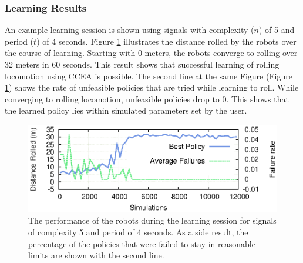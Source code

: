 \subsubsection{Learning Results}
An example learning session is shown using signals with complexity ($n$) of 5 and period ($t$) of 4 seconds.  
Figure \ref{fig:learning} illustrates the distance rolled by the robots over the course of learning. 
Starting with 0 meters, the robots converge to rolling over 32 meters in 60 seconds. 
This result shows that successful learning of rolling locomotion using CCEA is possible. 
The second line at the same Figure (Figure \ref{fig:learning}) shows the rate of unfeasible policies that are tried while learning to roll. 
While converging to rolling locomotion, unfeasible policies drop to 0. 
This shows that the learned policy lies within simulated parameters set by the user.

\begin{figure}[t]
\centering
\includegraphics[width=\columnwidth]{tex/ASME-journal/results/failures/learningVsFailures.eps}
\caption{The performance of the robots during the learning session for signals of complexity 5 and period of 4 seconds. As a side result, the percentage of the policies that were failed to stay in reasonable limits are shown with the second line. }
\label{fig:learning}
\end{figure}


